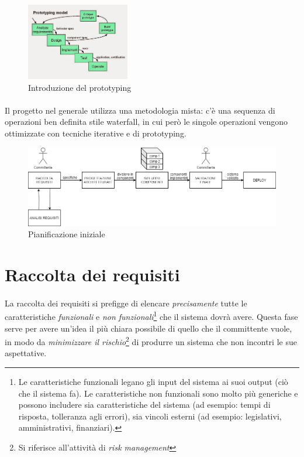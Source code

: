 \documentclass[11pt,a4paper,english]{article}
\begin{document}
\begin{figure}[H]
    \centering
    \includegraphics[width=0.4\textwidth]{img/prototyping.jpg}
    \caption{Introduzione del prototyping}
\end{figure}

\paragraph{} Il progetto nel generale utilizza una metodologia mista: c'è una sequenza di operazioni ben definita stile waterfall, in cui però le singole operazioni vengono ottimizzate con tecniche iterative e di prototyping. 

\begin{figure}[H]
    \centering
    \includegraphics[width=1\textwidth]{img/pianificazione iniziale.png}
    \caption{Pianificazione iniziale}
\end{figure}


\section{Raccolta dei requisiti}

\paragraph{} La raccolta dei requisiti \cite{req_analysis} si prefigge di elencare \emph{precisamente} tutte le caratteristiche \emph {funzionali} e \emph{non funzionali}\footnote{Le caratteristiche funzionali legano gli input del sistema ai suoi output (ciò che il sistema fa). Le caratteristiche non funzionali sono molto più generiche e possono includere sia caratteristiche del sistema (ad esempio: tempi di risposta, tolleranza agli errori), sia vincoli esterni (ad esempio: legislativi, amministrativi, finanziari).} che il sistema dovrà avere. Questa fase serve per avere un'idea il più chiara possibile di quello che il committente vuole, in modo da \emph{minimizzare il rischio}\footnote{Si riferisce all'attività di \emph{risk management}} di produrre un sistema che non incontri le sue aspettative.
\end{document}
